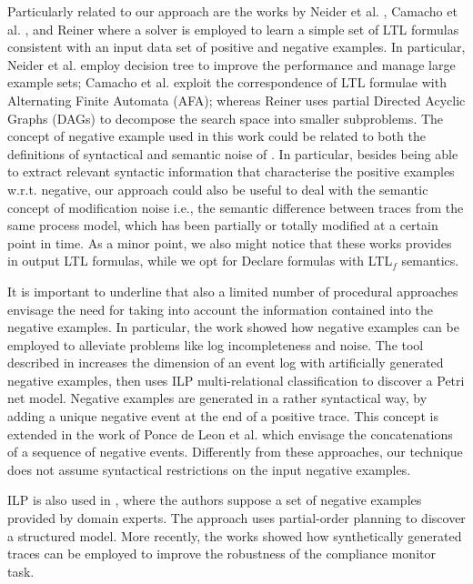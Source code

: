 Particularly related to our approach are the works by Neider et al. \cite{2018-Neider}, Camacho et al. \cite{2019-Camacho}, and Reiner \cite{2019-Riener} where a solver is employed to learn a simple set of LTL formulas consistent with an input data set of positive and negative examples. In particular, Neider et al. \cite{2018-Neider} employ decision tree to improve the performance and manage large example sets; Camacho et al. \cite{2019-Camacho} exploit the correspondence of LTL formulae with Alternating Finite Automata (AFA); whereas Reiner \cite{2019-Riener} uses partial Directed Acyclic Graphs (DAGs) to decompose the search space into smaller subproblems.
The concept of negative example used in this work could be related to both the definitions of syntactical and semantic noise of \cite{2009-Gunther}. In particular, besides being able to extract relevant syntactic information that characterise the positive examples w.r.t. negative, our approach could also be useful to deal with the semantic concept of modification noise i.e., the semantic difference between traces from the same process model, which has been partially or totally modified at a certain point in time.  As a minor point, we also might notice that these works provides in output LTL formulas, while we opt for Declare formulas with LTL$_f$ semantics.
 
It is important to underline that also a limited number of procedural approaches envisage the need for taking into account the information contained into the negative examples. 
In particular, the work \cite{2015-Ponce} showed how negative examples can be employed to alleviate problems like log incompleteness and noise.
The tool described in \cite{2009-Goedertier} increases the dimension of an event log with artificially generated negative examples, then uses \ac{ILP} multi-relational classification to discover a Petri net model. 
Negative examples are generated in a rather syntactical way, by adding a unique negative event at the end of a positive trace. This concept is extended in the work of Ponce de Leon et al. \cite{2018-Ponce} which envisage the concatenations of a sequence of negative events. Differently from these approaches, our technique does not assume syntactical restrictions on the input negative examples.

\ac{ILP} is also used in \cite{2006-Ferreira}, where the authors suppose a set of negative examples provided by domain experts. The approach uses partial-order planning to discover a structured model. More recently, the works \cite{2014-Broucke,2014-BrouckePhD} showed how synthetically generated traces can be employed to improve the robustness of the compliance monitor task. 
 
